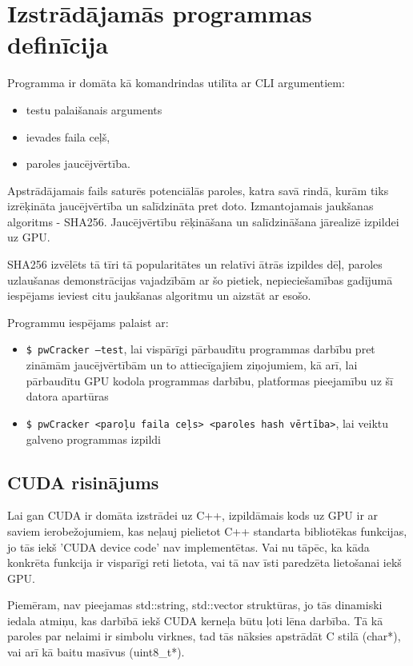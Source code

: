 \documentclass[12pt]{report}%
\theoremstyle{definition}
\begin{document}
\section{Izstrādājamās programmas definīcija}
Programma ir domāta kā komandrindas utilīta ar CLI argumentiem:
\begin{itemize}
  \item testu palaišanais arguments
  \item ievades faila ceļš,
  \item paroles jaucējvērtība.
\end{itemize}

Apstrādājamais fails saturēs potenciālās paroles, katra savā rindā, kurām tiks izrēķināta jaucējvērtība un
salīdzināta pret doto. Izmantojamais jaukšanas algoritms - SHA256. Jaucējvērtību rēķināšana un salīdzināšana
jārealizē izpildei uz GPU.

SHA256 izvēlēts tā tīri tā popularitātes un relatīvi ātrās izpildes dēļ, paroles uzlaušanas demonstrācijas
vajadzībām ar šo pietiek, nepieciešamības gadījumā iespējams ieviest citu jaukšanas algoritmu un aizstāt
ar esošo.


Programmu iespējams palaist ar:
\begin{itemize}
  \item \texttt{\$ pwCracker --test}, lai vispārīgi pārbaudītu programmas darbību pret zināmām jaucējvērtībām
  un to attiecīgajiem ziņojumiem, kā arī, lai pārbaudītu GPU kodola programmas darbību, platformas
  pieejamību uz šī datora apartūras
  \item \texttt{\$ pwCracker <paroļu faila ceļs> <paroles hash vērtība>}, lai veiktu galveno programmas izpildi
\end{itemize}


\subsection{CUDA risinājums}

Lai gan CUDA ir domāta izstrādei uz C++, izpildāmais kods uz GPU ir ar saviem ierobežojumiem, kas neļauj pielietot C++ standarta bibliotēkas funkcijas, jo tās iekš 'CUDA device code' nav implementētas.
Vai nu tāpēc, ka kāda konkrēta funkcija ir visparīgi reti lietota, vai tā nav īsti paredzēta lietošanai iekš GPU.

Piemēram, nav pieejamas std::string, std::vector struktūras, jo tās dinamiski iedala atmiņu, kas darbībā iekš CUDA kerneļa būtu ļoti lēna darbība.
Tā kā paroles par nelaimi ir simbolu virknes, tad tās nāksies apstrādāt C stilā (char*), vai arī kā baitu masīvus (uint8\_t*).
\end{document}
